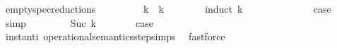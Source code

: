 \begin{isabellebody}
\endisatagproof
{\isafoldproof}%
%
\isadelimproof
\isanewline
%
\endisadelimproof
\isanewline
{}\isamarkupfalse%
\ empty{\isacharunderscore}spec{\isacharunderscore}reductions{\isacharcolon}\isanewline
\ \ \ {\isachardoublequoteopen}{\isacharparenleft}{\isacharbrackleft}{\isacharbrackright}{\isacharcomma}\ {}\ {\isasymturnstile}\ {\isacharbrackleft}{\isacharbrackright}\ {\isasymtriangleright}\ {\isacharbrackleft}{\isacharbrackright}{\isacharparenright}\ {\isasymhookrightarrow}\isactrlbsup k\isactrlesup \ {\isacharparenleft}{\isacharbrackleft}{\isacharbrackright}{\isacharcomma}\ k\ {\isasymturnstile}\ {\isacharbrackleft}{\isacharbrackright}\ {\isasymtriangleright}\ {\isacharbrackleft}{\isacharbrackright}{\isacharparenright}{\isachardoublequoteclose}\isanewline
%
\isadelimproof
\ \ %
\endisadelimproof
%
\isatagproof
{}\isamarkupfalse%
\ {\isacharparenleft}induct\ k{\isacharparenright}\isanewline
\ \ \ \ \isamarkupfalse%
\ {}\isanewline
\ \ \ \ \isamarkupfalse%
\ \isamarkupfalse%
\ {\isacharquery}case\ \isamarkupfalse%
\ simp\isanewline
\ \ \isamarkupfalse%
\isanewline
\ \ \ \ \isamarkupfalse%
\ {\isacharparenleft}Suc\ k{\isacharparenright}\isanewline
\ \ \ \ \isamarkupfalse%
\ \isamarkupfalse%
\ {\isacharquery}case\isanewline
\ \ \ \ \ \ \isamarkupfalse%
\ instant{\isacharunderscore}i\ operational{\isacharunderscore}semantics{\isacharunderscore}step{\isachardot}simps\ \isamarkupfalse%
\ fastforce\ \isanewline
\ \ \isamarkupfalse%
%
\endisatagproof
{\isafoldproof}%
%
\isadelimproof
\isanewline
%
\endisadelimproof
%
\isadelimtheory
\isanewline
%
\endisadelimtheory
%
\isatagtheory
{}\isamarkupfalse%
%
\endisatagtheory
{\isafoldtheory}%
%
\isadelimtheory
%
\endisadelimtheory
%
\end{isabellebody}%
\endinput
